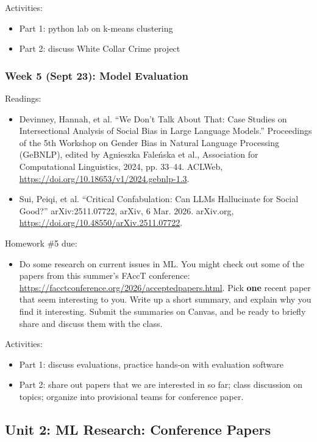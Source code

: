 \documentclass[12pt]{article}
\begin{document}
Activities:
\begin{itemize}
\item Part 1: python lab on k-means clustering
\item Part 2: discuss White Collar Crime project
\end{itemize}

\subsubsection*{Week 5 (Sept 23): Model Evaluation}
\label{sec:org0bd774d}
Readings:
\begin{itemize}
\item Devinney, Hannah, et al. “We Don't Talk About That: Case Studies on
Intersectional Analysis of Social Bias in Large Language Models.”
Proceedings of the 5th Workshop on Gender Bias in Natural Language
Processing (GeBNLP), edited by Agnieszka Faleńska et al.,
Association for Computational Linguistics, 2024, pp. 33–44. ACLWeb,
\url{https://doi.org/10.18653/v1/2024.gebnlp-1.3}.
\item Sui, Peiqi, et al. “Critical Confabulation: Can LLMs Hallucinate for
Social Good?” arXiv:2511.07722, arXiv, 6 Mar. 2026. arXiv.org,
\url{https://doi.org/10.48550/arXiv.2511.07722}.
\end{itemize}

Homework \#5 due:
\begin{itemize}
\item Do some research on current issues in ML. You might check out some
of the papers from this summer's FAccT conference:
\url{https://facctconference.org/2026/acceptedpapers.html}. Pick \textbf{one}
recent paper that seem interesting to you. Write up a short summary,
and explain why you find it interesting. Submit the summaries on
Canvas, and be ready to briefly share and discuss them with the
class.
\end{itemize}

Activities:
\begin{itemize}
\item Part 1: discuss evaluations, practice hands-on with evaluation
software
\item Part 2: share out papers that we are interested in so far; class
discussion on topics; organize into provisional teams for conference
paper.
\end{itemize}

\subsection*{Unit 2: ML Research: Conference Papers}
\label{sec:org11686ab}
\end{document}
